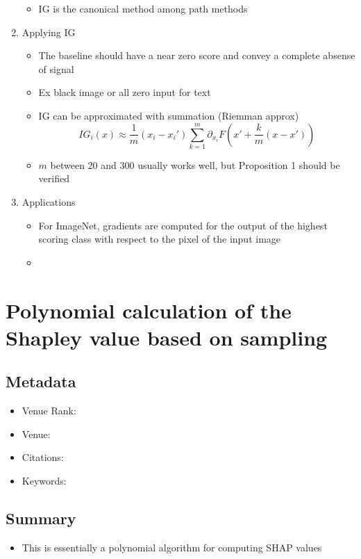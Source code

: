 \documentclass{article}
\begin{document}
\begin{enumerate}
\begin{itemize}
		\item IG is the canonical method among path methods
	\end{itemize}
	\item Applying IG
	\begin{itemize}
		\item The baseline should have a near zero score and convey a complete absense of signal
		\item Ex black image or all zero input for text
		\item IG can be approximated with summation (Riemman approx)
		$$IG_i(x) \approx \frac{1}{m}(x_i - x_i') \sum_{k=1}^m \partial_{x_i} F(x' + \frac{k}{m} (x - x'))$$
		\item $m$ between 20 and 300 usually works well, but Proposition 1 should be verified
	\end{itemize}
	\item Applications
	\begin{itemize}
		\item For ImageNet, gradients are computed for the output of the highest scoring class with respect to the pixel of the input image
		\item 
	\end{itemize}
\end{enumerate}

\pagebreak


\section*{Polynomial calculation of the Shapley value based on sampling \cite{castro2009polynomial}}

\subsection*{Metadata}
\begin{itemize}
	\item Venue Rank: 
	\item Venue:
	\item Citations: 
	\item Keywords: 
\end{itemize}

\subsection*{Summary}
\begin{itemize}
	\item This is essentially a polynomial algorithm for computing SHAP values
\end{itemize}
\end{document}
